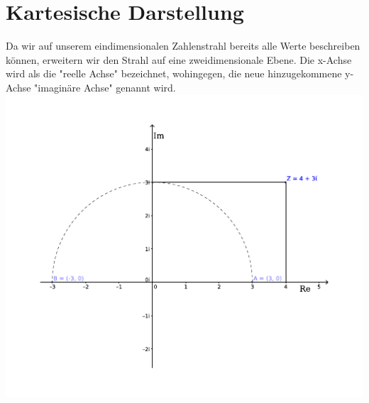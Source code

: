 \documentclass[12pt,a4paper]{scrbook}
\begin{document}
\section{Kartesische Darstellung}
Da wir auf unserem eindimensionalen Zahlenstrahl bereits alle Werte
beschreiben können, erweitern wir den Strahl auf eine zweidimensionale
Ebene. Die x-Achse wird als die "reelle Achse" bezeichnet, wohingegen,
die neue hinzugekommene y-Achse "imaginäre Achse" genannt wird.\\
\includegraphics[scale=1.9]{img/komplexe_zahlen.pdf}
\end{document}
